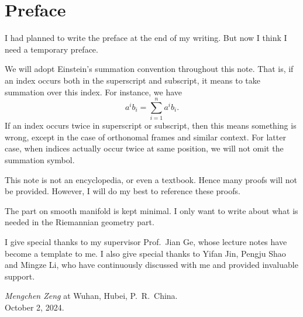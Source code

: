 \chapter{Preface}


I had planned to write the preface at the end of my writing.
But now I think I need a temporary preface.

We will adopt Einstein's summation convention throughout this note.
That is, if an index occurs both in the superscript and subscript, it means to take summation over this index.
For instance, we have
\[a^ib_i=\sum_{i=1}^na^ib_i.\]
If an index occurs twice in superscript or subscript, then this means something is wrong, except in the case of orthonomal frames and similar context.
For latter case, when indices actually occur twice at same position, we will not omit the summation symbol. 

This note is not an encyclopedia, or even a textbook.
Hence many proofs will not be provided.
However, I will do my best to reference these proofs.

The part on smooth manifold is kept minimal.
I only want to write about what is needed in the Riemannian geometry part.

I give special thanks to my supervisor Prof.\ Jian Ge, whose lecture notes have become a template to me.
I also give special thanks to Yifan Jin, Pengju Shao and Mingze Li, who  have continuously discussed with me and provided invaluable support.

\begin{flushright}
    \emph{Mengchen Zeng} at Wuhan, Hubei, P.\ R.\ China.\\
    October 2, 2024.
\end{flushright}